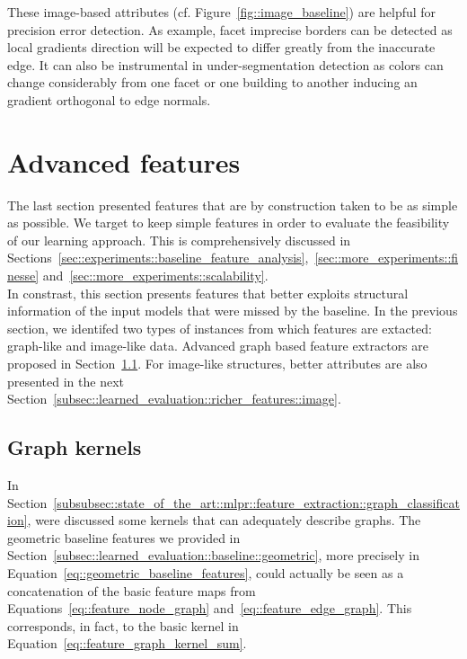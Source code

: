         These image-based attributes (cf. Figure~\ref{fig::image_baseline}) are helpful for precision error detection.
        As example, facet imprecise borders can be detected as local gradients direction will be expected to differ greatly from the inaccurate edge.
        It can also be instrumental in under-segmentation detection as colors can change considerably from one facet or one building to another inducing an gradient orthogonal to edge normals.

\section{Advanced features}
    \label{sec::learned_evaluation::richer_features}
    The last section presented features that are by construction taken to be as simple as possible.
    We target to keep simple features in order to evaluate the feasibility of our learning approach.
    This is comprehensively discussed in Sections~\ref{sec::experiments::baseline_feature_analysis},~\ref{sec::more_experiments::finesse} and~\ref{sec::more_experiments::scalability}.\\

    In constrast, this section presents features that better exploits structural information of the input models that were missed by the baseline.
    In the previous section, we identifed two types of instances from which features are extacted: graph-like and image-like data.
    Advanced graph based feature extractors are proposed in Section~\ref{subsec::learned_evaluation::richer_features::graph}.
    For image-like structures, better attributes are also presented in the next Section~\ref{subsec::learned_evaluation::richer_features::image}.

    \subsection{Graph kernels}
        \label{subsec::learned_evaluation::richer_features::graph}
        In Section~\ref{subsubsec::state_of_the_art::mlpr::feature_extraction::graph_classification}, were discussed some kernels that can adequately describe graphs.
        The geometric baseline features we provided in Section~\ref{subsec::learned_evaluation::baseline::geometric}, more precisely in Equation~\ref{eq::geometric_baseline_features}, could actually be seen as a concatenation of the basic feature maps from Equations~\ref{eq::feature_node_graph} and~\ref{eq::feature_edge_graph}.
        This corresponds, in fact, to the basic kernel in Equation~\ref{eq::feature_graph_kernel_sum}.\\

